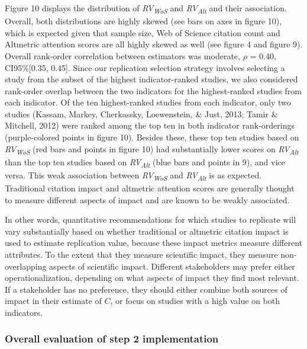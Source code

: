 \documentclass[
  man,floatsintext]{apa6}
\begin{document}
Figure 10 displays the distribution of \emph{RV\textsubscript{WoS}} and \emph{RV\textsubscript{Alt}} and their association. Overall, both distributions are highly skewed (see bars on axes in figure 10), which is expected given that sample size, Web of Science citation count and Altmetric attention scores are all highly skewed as well (see figure 4 and figure 9). Overall rank-order correlation between estimators was moderate, \(\rho\) = 0.40, CI95\%{[}0.35, 0.45{]}. Since our replication selection strategy involves selecting a study from the subset of the highest indicator-ranked studies, we also considered rank-order overlap between the two indicators for the highest-ranked studies from each indicator. Of the ten highest-ranked studies from each indicator, only two studies (Kassam, Markey, Cherkassky, Loewenstein, \& Just, 2013; Tamir \& Mitchell, 2012) were ranked among the top ten in both indicator rank-orderings (purple-colored points in figure 10). Besides these, these top ten studies based on \emph{RV\textsubscript{WoS}} (red bars and points in figure 10) had substantially lower scores on \emph{RV\textsubscript{Alt}} than the top ten studies based on \emph{RV\textsubscript{Alt}} (blue bars and points in 9), and vice versa. This weak association between \emph{RV\textsubscript{WoS}} and \emph{RV\textsubscript{Alt}} is as expected. Traditional citation impact and altmetric attention scores are generally thought to measure different aspects of impact and are known to be weakly associated.

In other words, quantitative recommendations for which studies to replicate will vary substantially based on whether traditional or altmetric citation impact is used to estimate replication value, because these impact metrics measure different attributes. To the extent that they measure scientific impact, they measure non-overlapping aspects of scientific impact. Different stakeholders may prefer either operationalization, depending on what aspects of impact they find most relevant. If a stakeholder has no preference, they should either combine both sources of impact in their estimate of \(C\), or focus on studies with a high value on both indicators.

\hypertarget{overall-evaluation-of-step-2-implementation}{%
\subsubsection{Overall evaluation of step 2 implementation}\label{overall-evaluation-of-step-2-implementation}}
\end{document}
